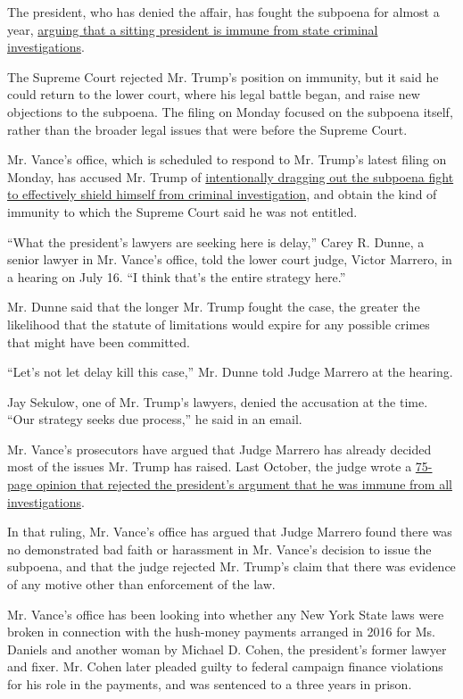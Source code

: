 The president, who has denied the affair, has fought the subpoena for
almost a year,
\href{https://www.nytimes.com/2019/09/19/nyregion/trump-tax-returns-lawsuit.html}{arguing
that a sitting president is immune from state criminal investigations}.

The Supreme Court rejected Mr. Trump's position on immunity, but it said
he could return to the lower court, where his legal battle began, and
raise new objections to the subpoena. The filing on Monday focused on
the subpoena itself, rather than the broader legal issues that were
before the Supreme Court.

Mr. Vance's office, which is scheduled to respond to Mr. Trump's latest
filing on Monday, has accused Mr. Trump of
\href{https://www.nytimes.com/2020/07/16/nyregion/donald-trump-taxes-cyrus-vance.html}{intentionally
dragging out the subpoena fight to effectively shield himself from
criminal investigation}, and obtain the kind of immunity to which the
Supreme Court said he was not entitled.

``What the president's lawyers are seeking here is delay,'' Carey R.
Dunne, a senior lawyer in Mr. Vance's office, told the lower court
judge, Victor Marrero, in a hearing on July 16. ``I think that's the
entire strategy here.''

Mr. Dunne said that the longer Mr. Trump fought the case, the greater
the likelihood that the statute of limitations would expire for any
possible crimes that might have been committed.

``Let's not let delay kill this case,'' Mr. Dunne told Judge Marrero at
the hearing.

Jay Sekulow, one of Mr. Trump's lawyers, denied the accusation at the
time. ``Our strategy seeks due process,'' he said in an email.

Mr. Vance's prosecutors have argued that Judge Marrero has already
decided most of the issues Mr. Trump has raised. Last October, the judge
wrote a
\href{https://www.nytimes.com/2019/10/07/nyregion/trump-taxes-lawsuit-vance.html}{75-page
opinion that rejected the president's argument that he was immune from
all investigations}.

In that ruling, Mr. Vance's office has argued that Judge Marrero found
there was no demonstrated bad faith or harassment in Mr. Vance's
decision to issue the subpoena, and that the judge rejected Mr. Trump's
claim that there was evidence of any motive other than enforcement of
the law.

Mr. Vance's office has been looking into whether any New York State laws
were broken in connection with the hush-money payments arranged in 2016
for Ms. Daniels and another woman by Michael D. Cohen, the president's
former lawyer and fixer. Mr. Cohen later pleaded guilty to federal
campaign finance violations for his role in the payments, and was
sentenced to a three years in prison.

